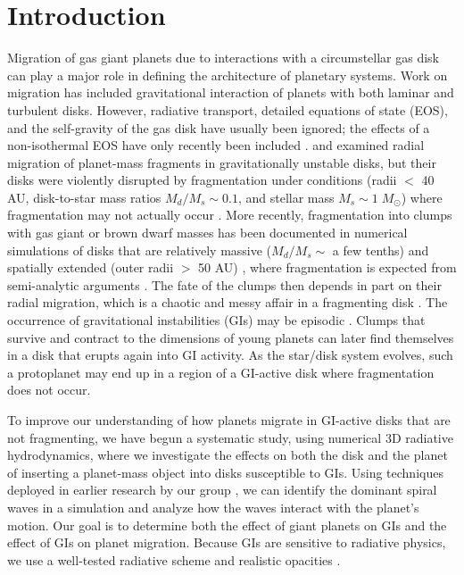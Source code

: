 \documentclass[12pt,manuscript,authoryear]{aastex}
\begin{document}
\label{firstpage}

\section{Introduction}

Migration of gas giant planets due to interactions with a circumstellar gas disk can play a major role in defining the architecture of planetary systems. Work on migration \citep[see review by][]{papaloizou2007} has included gravitational interaction of planets with both laminar and turbulent disks. However, radiative transport, detailed equations of state (EOS), and the self-gravity of the gas disk have usually been ignored; the effects of a non-isothermal EOS have only recently been included \citep[e.g.,][]{paardekooper2006,paardekooper2010,paardekooper2011}. 
\citet{boss2005} and \citet{mayer2004} examined radial migration of planet-mass fragments in gravitationally unstable disks, but their disks were violently disrupted by fragmentation under conditions (radii $<$ 40 AU, disk-to-star mass ratios $M_d/M_s \sim 0.1$, and stellar mass $M_s \sim 1\;M_{\odot}$) where fragmentation may not actually occur  \citep{rafikov2005,rafikov2007,boley2006,boley2007b,boley2008,forgan2009,cai2010}. More recently, fragmentation into clumps with gas giant or brown dwarf masses has been documented in numerical simulations of disks that are relatively massive ($M_d/M_s \sim$ a few tenths) and spatially extended (outer radii $>$ 50 AU) \citep{krumholz2007,stamatellos2007,stamatellos2009,boley2009,boley2010}, where fragmentation is expected from semi-analytic arguments \citep[e.g.,][]{clarke2009,rafikov2009,dodson2009}. The fate of the clumps then depends in part on their radial migration, which is a chaotic and messy affair in a fragmenting disk \citep[e.g.,][]{boley2009,boley2010,vorobyov2010,boley2010b}. The occurrence of gravitational instabilities (GIs) may be episodic \citep[e.g.,][]{vorobyov2006,vorobyov2010b,zhu2010}. Clumps that survive and contract to the dimensions of young planets can later find themselves in a disk that erupts again into GI activity. As the star/disk system evolves, such a protoplanet may end up in a region of a GI-active disk where fragmentation does not occur.

To improve our understanding of how planets migrate in GI-active disks that are not fragmenting, we have begun a systematic study, using numerical 3D radiative hydrodynamics, where we investigate the effects on both the disk and the planet of inserting a planet-mass object into disks susceptible to GIs. Using techniques deployed in earlier research by our group \citep{pickett2003, mejia2005,cai2006,cai2008,boley2006,boley2007b,michael2010}, we can identify the dominant spiral waves in a simulation and analyze how the waves interact with the planet's motion. Our goal is to determine both the effect of giant planets on GIs and the effect of GIs on planet migration. Because GIs are sensitive to radiative physics, we use a well-tested radiative scheme \citep{boley2007b} and realistic opacities \citep{dalessio2001}. 
\end{document}
